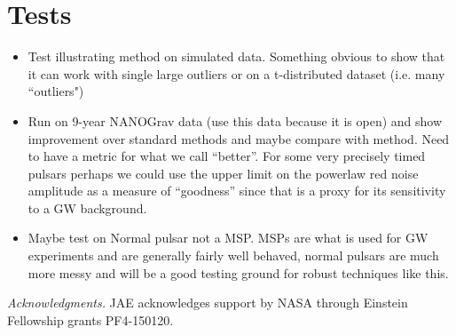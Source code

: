 \documentclass[iop,apj]{emulateapj}
\begin{document}
\section{Tests}
\begin{itemize}
\item Test illustrating method on simulated data. Something obvious to show that it can work with single large outliers or on a t-distributed dataset (i.e. many ``outliers")
\item Run on 9-year NANOGrav data (use this data because it is open) and show improvement over standard methods and maybe compare with \cite{vvh17} method. Need to have a metric for what we call ``better''. For some very precisely timed pulsars perhaps we could use the upper limit on the powerlaw red noise amplitude as a measure of ``goodness'' since that is a proxy for its sensitivity to a GW background.
\item Maybe test on Normal pulsar not a MSP. MSPs are what is used for GW experiments and are generally fairly well behaved, normal pulsars are much more messy and will be a good testing ground for robust techniques like this.
\end{itemize}

\acknowledgements

\emph{Acknowledgments.}
JAE acknowledges support by NASA through Einstein Fellowship grants PF4-150120.



\end{document}
